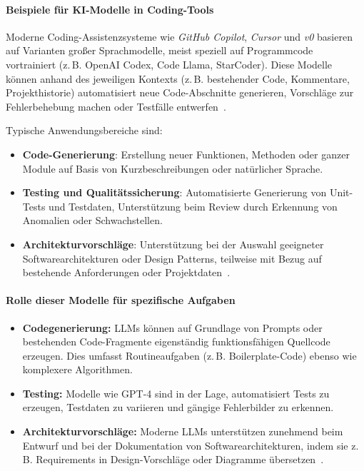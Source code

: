 \paragraph{Beispiele für KI-Modelle in Coding-Tools}

Moderne Coding-Assistenzsysteme wie \textit{GitHub Copilot}, \textit{Cursor}
und \textit{v0} basieren auf Varianten großer Sprachmodelle, meist speziell auf
Programmcode vortrainiert (z.\,B. OpenAI Codex, Code Llama, StarCoder). Diese
Modelle können anhand des jeweiligen Kontexts (z.\,B. bestehender Code,
Kommentare, Projekthistorie) automatisiert neue Code-Abschnitte generieren,
Vorschläge zur Fehlerbehebung machen oder Testfälle
entwerfen~\cite{coutinho_role_2024, esposito_generative_2025}.

Typische Anwendungsbereiche sind:
\begin{itemize}
    \item \textbf{Code-Generierung}: Erstellung neuer Funktionen, Methoden oder ganzer Module auf Basis von Kurzbeschreibungen oder natürlicher Sprache.
    \item \textbf{Testing und Qualitätssicherung}: Automatisierte Generierung von Unit-Tests und Testdaten, Unterstützung beim Review durch Erkennung von Anomalien oder Schwachstellen.
    \item \textbf{Architekturvorschläge}: Unterstützung bei der Auswahl geeigneter Softwarearchitekturen oder Design Patterns, teilweise mit Bezug auf bestehende Anforderungen oder Projektdaten~\cite{esposito_generative_2025}.
\end{itemize}

\paragraph{Rolle dieser Modelle für spezifische Aufgaben}

\begin{itemize}
    \item \textbf{Codegenerierung:} LLMs können auf Grundlage von Prompts oder bestehenden Code-Fragmente eigenständig funktionsfähigen Quellcode erzeugen. Dies umfasst Routineaufgaben (z.\,B. Boilerplate-Code) ebenso wie komplexere Algorithmen.
    \item \textbf{Testing:} Modelle wie GPT-4 sind in der Lage, automatisiert Tests zu erzeugen, Testdaten zu variieren und gängige Fehlerbilder zu erkennen.
    \item \textbf{Architekturvorschläge:} Moderne LLMs unterstützen zunehmend beim Entwurf und bei der Dokumentation von Softwarearchitekturen, indem sie z.\,B. Requirements in Design-Vorschläge oder Diagramme übersetzen~\cite{esposito_generative_2025, nguyen-duc_generative_2023}.
\end{itemize}

